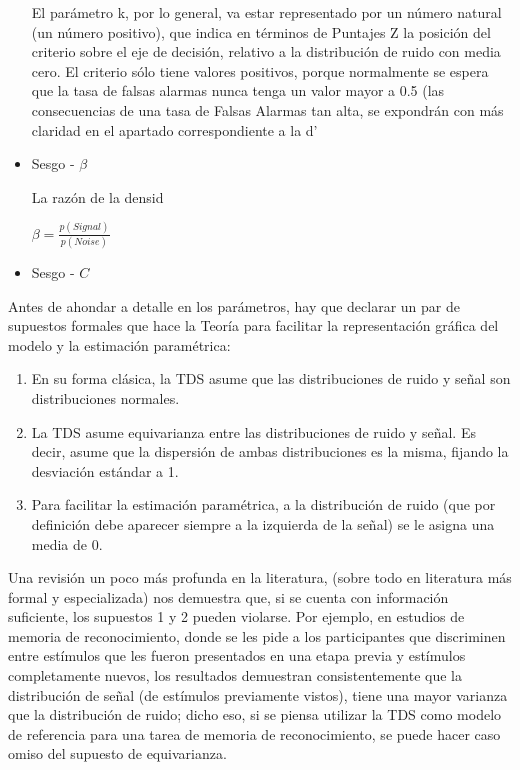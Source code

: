 \begin{itemize}
 El parámetro k, por lo general, va estar representado por un número natural (un número positivo), que indica en términos de Puntajes Z  la posición del criterio sobre el eje de decisión, relativo a la distribución de ruido con media cero. El criterio sólo tiene valores positivos, porque normalmente se espera que la tasa de falsas alarmas nunca tenga un valor mayor a 0.5 (las consecuencias de una tasa de Falsas Alarmas tan alta, se expondrán con más claridad en el apartado correspondiente a la d’


\item Sesgo - $\beta$

La razón de la densid

$\beta = \frac{p(Signal)}{p(Noise)}$


\item Sesgo - $C$


\end{itemize}

Antes de ahondar a detalle en los parámetros, hay que declarar un par de supuestos formales que hace la Teoría para facilitar la representación gráfica del modelo y la estimación paramétrica:

\begin{enumerate}
\item En su forma clásica, la TDS asume que las distribuciones de ruido y señal son distribuciones normales.
\item La TDS asume equivarianza entre las distribuciones de ruido y señal. Es decir, asume que la dispersión de ambas distribuciones es la misma, fijando la desviación estándar a 1.
\item Para facilitar la estimación paramétrica, a la distribución de ruido (que por definición debe aparecer siempre a la izquierda de la señal) se le asigna una media de 0.
\end{enumerate}

Una revisión un poco más profunda en la literatura, (sobre todo en literatura más formal y especializada) nos demuestra que, si se cuenta con información suficiente, los supuestos 1 y 2 pueden violarse. Por ejemplo, en estudios de memoria de reconocimiento, donde se les pide a los participantes que discriminen entre estímulos que les fueron presentados en una etapa previa y estímulos completamente nuevos,  los resultados demuestran consistentemente que la distribución de señal (de estímulos previamente vistos), tiene una mayor varianza que la distribución de ruido; dicho eso, si se piensa utilizar la TDS como modelo de referencia para una tarea de memoria de reconocimiento, se puede hacer caso omiso del supuesto de equivarianza.  

